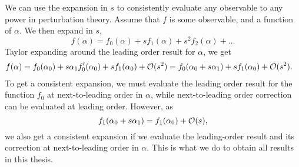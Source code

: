 We can use the expansion in $s$ to consistently evaluate any observable to any power in perturbation theory.
Assume that $f$ is some observable, and a function of $\alpha$.
We then expand in $s$,
%
\begin{equation}
    f(\alpha) = f_0(\alpha) + s f_1(\alpha) + s^2 f_2(\alpha) + \dots
\end{equation}
%
Taylor expanding around the leading order result for $\alpha$, we get
%
\begin{align*}
    f(\alpha) 
    & 
    = 
    f_0(\alpha_0)
    +
    s\alpha_1  f_0'(\alpha_0)
    +
    s f_1(\alpha_0)
    + \mathcal O(s^2)
    = f_0(\alpha_0 + s \alpha_1)
    + s f_1(\alpha_0)
    + \mathcal O(s^2).
\end{align*}
%
To get a consistent expansion, we must evaluate the leading order result for the function $f_0$ at next-to-leading order in $\alpha$, while next-to-leading order correction can be evaluated at leading order.
However, as
%
\begin{equation}
    f_1(\alpha_0 + s\alpha_1) = f_1(\alpha_0) + \mathcal O(s),
\end{equation}
%
we also get a consistent expansion if we evaluate the leading-order result and its correction at next-to-leading order in $\alpha$.
This is what we do to obtain all results in this thesis.
